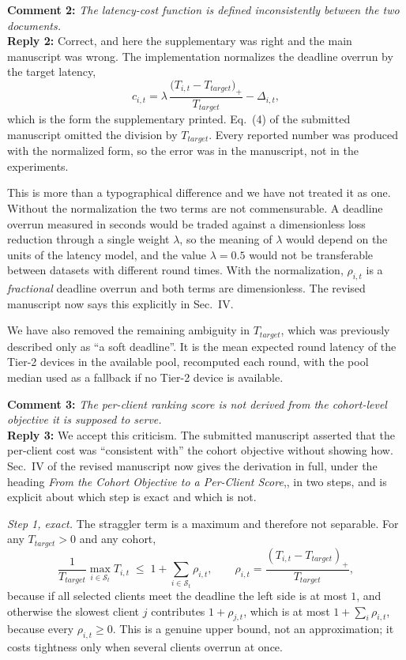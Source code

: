 \documentclass[10pt]{article}
\begin{document}
\vspace{0.5em}
\noindent
\textbf{Comment 2:} \textit{The latency-cost function is defined inconsistently between the two documents.}\\
\noindent
\textbf{Reply 2:} Correct, and here the supplementary was right and the main manuscript was wrong. The implementation normalizes the deadline overrun by the target latency,
\[
c_{i,t}=\lambda\,\frac{\bigl(T_{i,t}-T_{target}\bigr)_{+}}{T_{target}}-\Delta_{i,t},
\]
which is the form the supplementary printed. Eq.~(4) of the submitted manuscript omitted the division by $T_{target}$. Every reported number was produced with the normalized form, so the error was in the manuscript, not in the experiments.

This is more than a typographical difference and we have not treated it as one. Without the normalization the two terms are not commensurable. A deadline overrun measured in seconds would be traded against a dimensionless loss reduction through a single weight $\lambda$, so the meaning of $\lambda$ would depend on the units of the latency model, and the value $\lambda=0.5$ would not be transferable between datasets with different round times. With the normalization, $\rho_{i,t}$ is a \emph{fractional} deadline overrun and both terms are dimensionless. The revised manuscript now says this explicitly in Sec.~IV.

We have also removed the remaining ambiguity in $T_{target}$, which was previously described only as ``a soft deadline''. It is the mean expected round latency of the Tier-2 devices in the available pool, recomputed each round, with the pool median used as a fallback if no Tier-2 device is available.

\vspace{0.5em}
\noindent
\textbf{Comment 3:} \textit{The per-client ranking score is not derived from the cohort-level objective it is supposed to serve.}\\
\noindent
\textbf{Reply 3:} We accept this criticism. The submitted manuscript asserted that the per-client cost was ``consistent with'' the cohort objective without showing how. Sec.~IV of the revised manuscript now gives the derivation in full, under the heading \emph{From the Cohort Objective to a Per-Client Score},, in two steps, and is explicit about which step is exact and which is not.

\emph{Step 1, exact.} The straggler term is a maximum and therefore not separable. For any $T_{target}>0$ and any cohort,
\[
\frac{1}{T_{target}}\max_{i\in\mathcal{S}_t}T_{i,t}\;\le\;1+\sum_{i\in\mathcal{S}_t}\rho_{i,t},\qquad \rho_{i,t}=\frac{(T_{i,t}-T_{target})_+}{T_{target}},
\]
because if all selected clients meet the deadline the left side is at most $1$, and otherwise the slowest client $j$ contributes $1+\rho_{j,t}$, which is at most $1+\sum_i\rho_{i,t}$, because every $\rho_{i,t}\ge 0$. This is a genuine upper bound, not an approximation; it costs tightness only when several clients overrun at once.
\end{document}
